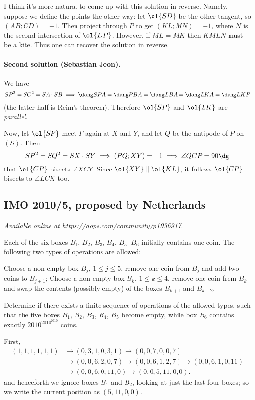 \documentclass[11pt]{scrartcl}
\begin{document}
\begin{remark*}
  I think it's more natural to come up with
  this solution in reverse.
  Namely, suppose we define the points the other way:
  let $\ol{SD}$ be the other tangent, so $(AB;CD) = -1$.
  Then project through $P$ to get $(KL;MN) = -1$,
  where $N$ is the second intersection of $\ol{DP}$.
  However, if $ML = MK$ then $KMLN$ must be a kite.
  Thus one can recover the solution in reverse.
\end{remark*}

\paragraph{Second solution (Sebastian Jeon).}
We have \[ SP^2 = SC^2 = SA \cdot SB
  \implies
  \dang SPA = \dang PBA = \dang LBA = \dang LKA = \dang LKP \]
(the latter half is Reim's theorem).
Therefore $\ol{SP}$ and $\ol{LK}$ are \emph{parallel}.

Now, let $\ol{SP}$ meet $\Gamma$ again at $X$ and $Y$,
and let $Q$ be the antipode of $P$ on $(S)$.
Then
\[ SP^2 = SQ^2 = SX \cdot SY
  \implies (PQ;XY) = -1 \implies \angle QCP = 90\dg \]
that $\ol{CP}$ bisects $\angle XCY$.
Since $\ol{XY} \parallel \ol{KL}$,
it follows $\ol{CP}$ bisects to $\angle LCK$ too.
\pagebreak

\subsection{IMO 2010/5, proposed by Netherlands}
\textsl{Available online at \url{https://aops.com/community/p1936917}.}
\begin{mdframed}[style=mdpurplebox,frametitle={Problem statement}]
Each of the six boxes $B_1$, $B_2$, $B_3$, $B_4$, $B_5$, $B_6$
initially contains one coin.
The following two types of operations are allowed:
\begin{enumerate}
  \ii Choose a non-empty box $B_j$, $1\leq j \leq 5$,
  remove one coin from $B_j$ and add two coins to $B_{j+1}$;
  \ii Choose a non-empty box $B_k$, $1\leq k \leq 4$,
  remove one coin from $B_k$ and swap the contents
  (possibly empty) of the boxes $B_{k+1}$ and $B_{k+2}$.
\end{enumerate}
Determine if there exists a finite sequence of operations of the allowed types,
such that the five boxes $B_1$, $B_2$, $B_3$, $B_4$, $B_5$ become empty,
while box $B_6$ contains exactly $2010^{2010^{2010}}$ coins.
\end{mdframed}
First,
\begin{align*}
  (1,1,1,1,1,1) &\to (0,3,1,0,3,1) \to (0,0,7,0,0,7) \\
  &\to (0,0,6,2,0,7) \to (0,0,6,1,2,7) \to (0,0,6,1,0,11) \\
  &\to (0,0,6,0,11,0) \to (0,0,5,11,0,0).
\end{align*}
and henceforth we ignore boxes $B_1$ and $B_2$,
looking at just the last four boxes;
so we write the current position as $(5,11,0,0)$.
\end{document}
